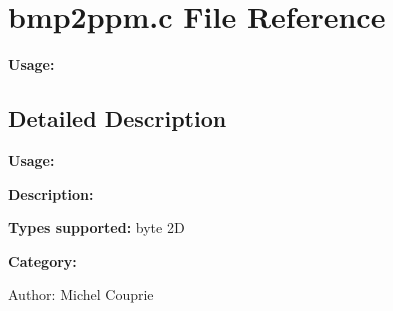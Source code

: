 \section{bmp2ppm.c File Reference}
\label{bmp2ppm_8c}
{\bf Usage:} 



\subsection{Detailed Description}
{\bf Usage:} 

{\bf Description:}

{\bf Types supported:} byte 2D

{\bf Category:}

\begin{Desc}
\item[Author:]Michel Couprie \end{Desc}

